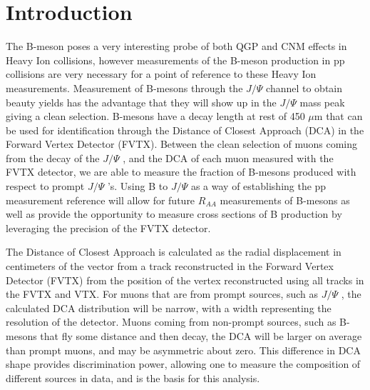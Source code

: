 \documentclass[12pt]{article}
\newcommand{\pt}{$P_{t}$ }
\newcommand{\jpsi}{$J/\Psi$ }
\begin{document}
\tableofcontents

\newpage

\section{Introduction}

The B-meson poses a very interesting probe of both QGP and CNM effects in Heavy Ion collisions, however measurements of the B-meson production in pp collisions 
are very necessary for a point of reference to these Heavy Ion measurements. 
Measurement of B-mesons through the \jpsi channel to obtain beauty yields has the advantage that they will show up in the \jpsi mass peak giving a clean selection.
B-mesons have a decay length at rest of 450 $\mu$m that can be used for identification through the Distance of Closest Approach (DCA) in the Forward Vertex Detector (FVTX). 
Between the clean selection of muons coming from the decay of the \jpsi, and the DCA of each muon measured with the FVTX detector, we are able to measure the fraction of 
B-mesons produced with respect to prompt \jpsi's. Using B to \jpsi as a way of establishing the pp measurement reference will allow for future $R_{AA}$ measurements 
of B-mesons as well as provide the opportunity to measure cross sections of B production by leveraging the precision of the FVTX detector.

The Distance of Closest Approach is calculated as the radial displacement in centimeters
of the vector from a track reconstructed in the Forward Vertex Detector (FVTX) from the position of the 
vertex reconstructed using all tracks in the FVTX and VTX.  For muons that are from prompt sources,
such as \jpsi, the calculated DCA distribution will be narrow, with a width representing the resolution of the 
detector.  Muons coming from non-prompt sources, such as B-mesons that fly some distance and then decay,
the DCA will be larger on average than prompt muons, and may be asymmetric about zero.  This difference in
DCA shape provides discrimination power, allowing one to measure the composition of different sources in data,
and is the basis for this analysis.

\end{document}
